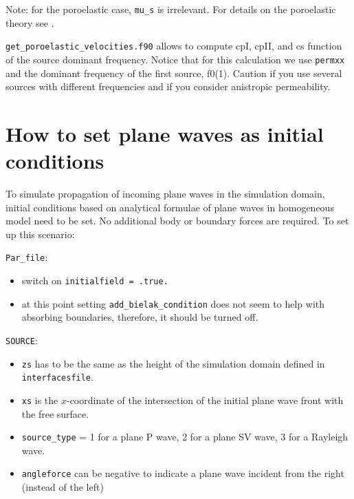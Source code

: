 \documentclass[oneside,english,onecolumn,letterpaper]{book}
\begin{document}
\begin{description}[style=nextline, labelindent=1em, font=\normalfont]
Note: for the poroelastic case, \texttt{mu\_s} is irrelevant.
For details on the poroelastic theory see \cite{MoTr08}.

\end{description}

\texttt{get\_poroelastic\_velocities.f90} allows to compute cpI, cpII, and cs function of
the source dominant frequency. Notice that for this calculation we use \texttt{permxx}
and the dominant frequency of the first source, f0(1). Caution if you use
several sources with different frequencies and if you consider anistropic
permeability.

\section{How to set plane waves as initial conditions}
To simulate propagation of incoming plane waves in the simulation domain, initial conditions based on analytical formulae of plane waves in homogeneous model need to be set. No additional body or boundary forces are required. To set up this scenario:
%
\begin{description}
\item{\verb+Par_file+:}
  \begin{itemize}
  \item switch on \verb+initialfield = .true. +
  \item at this point setting \verb+add_bielak_condition+ does not seem to help with absorbing boundaries, therefore, it should be turned off.
  \end{itemize}
\item{\verb+SOURCE+:}
  \begin{itemize}
  \item \verb+zs+ has to be the same as the height of the simulation domain defined in \verb+interfacesfile+.
  \item \verb+xs+ is the $x$-coordinate of the intersection of the initial plane wave front with the free surface.
  \item \verb+source_type+ = 1 for a plane P wave, 2 for a plane SV wave, 3 for a Rayleigh wave.
  \item \verb+angleforce+ can be negative to indicate a plane wave incident from the right (instead of the left)
  \end{itemize}
\end{description}

\end{document}
